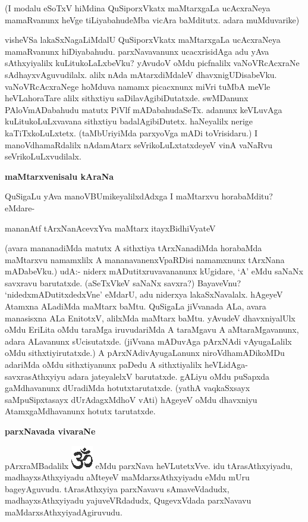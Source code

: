 \noindent
  (I modalu eSoTxV hiMdina QuSiporxVkatx maMtarxgaLa ucAcxraNeya mamaRvanunx heVge tiLiya\-bahu\-deMba vicAra baMditutx. adara muMduvarike) 
  
visheVSa lakaSxNagaLiMdalU QuSiporxVkatx maMtarxgaLa ucAcxraNeya mamaRvanunx hiDiyabahudu. parxNavavanunx ucacxrisidAga adu yAva sAthxyiyalilx kuLitukoLaLxbeVku? yAvudoV oMdu picfnalilx vaNoVRcAcxraNe sAdhayxvAguvudilalx. alilx nAda mAtarxdiMdaleV dhavxnigUDisabeVku. vaNoVRcAcxraNege hoMduva namamx picacxnunx miVri tuMbA meVle heVLahoraTare alilx sithxtiyu saDilavAgibiDutatxde. swMDanunx PAloVmADabahudu matutx PiVlf mADabahudaSeTx. adanunx keVLuvAga kuLitukoLuLxvavana sithxtiyu badalAgibiDutetx. haNeyalilx nerige kaTiTxkoLuLxtetx. (taMbUriyiMda parxyoVga mADi toVrisidaru.) I manoVdhamaRdalilx nAdamAtarx seVrikoLuLxtatxdeyeV vinA vaNaRvu seVrikoLuLxvudilalx.
  
 {\bigskip
\noindent
{\large\bf maMtarxvenisalu kAraNa}}\label{page120}
\medskip

\noindent 
QuSigaLu yAva manoVBUmikeyalilxdAdxga I maMtarxvu horabaMditu? eMdare-
 
 \begin{shloka}
mananAtf tArxNanAcevxYva maMtarx itayxBidhiVyateV\label{121}
 \end{shloka}

\noindent
(avara mananadiMda matutx A sithxtiya tArxNanadiMda horabaMda maMtarxvu namamxlilx A mananavanenxV\-paRDisi namamxnunx tArxNana mADabeVku.) udA:- niderx mADutitxruvavananunx kUgidare, `A' eMdu saNaNx savxravu barutatxde. (aSeTxVkeV saNaNx savxra?) BayaveVnu? `nidedxmADutitxdedxVne' eMdarU, adu niderxya lakaSxNa\-valalx. hAgeyeV Atamxna ALadiMda maMtarx baMtu. QuSigaLa jiVvanada ALa, avara manasisxna ALa EnitotxV, alilxMda maMtarx baMtu. yAvudeV dhavxniyalUlx oMdu EriLita oMdu taraMga iruvudariMda A taraM\-gavu A aMtaraMgavanunx, adara ALavanunx sUcisutatxde. (jiVvana mADuvAga pArxNAdi vAyu\-gaLalilx oMdu sithxti\-yirutatxde.) A pArxNAdivAyugaLanunx niroVdhamADikoMDu adariMda oMdu sithxtiyanunx paDedu A sithxtiyalilx heVLidAga-savxrasAthxyiyu adara jateyalelxV barutatxde. gALiyu oMdu puSapxda gaMdha\-vanunx dUradiMda hotutxtarutatxde. (yathA vaqkaSxsayx\label{121} saMpuSipxtasayx dUrAdagxMdhoV vAti) hAgeyeV oMdu dhavxniyu AtamxgaMdhavanunx hotutx tarutatxde.

{\bigskip
\noindent
{\large\bf parxNavada vivaraNe}}
\medskip

\noindent
pArxraMBadalilx {\includegraphics[scale=.6]{om.eps}} eMdu parxNava heVLutetxVve. idu tArasAthxyiyadu, madhayx\-sAthxyiyadu aMteyeV maMdarx\-sAthxyiyadu eMdu mUru bageyAguvudu. tArasAthxyiya parxNavavu sAmaveVdadudx, madhayx\-sAthxyi\-yadu yajuveVRdadudx, QugevxVdada parxNavavu maMdarxsAthxyiyadAgiruvudu.

